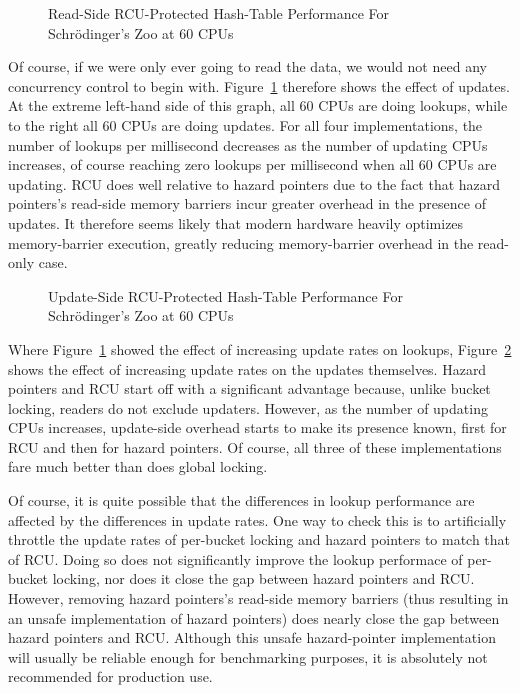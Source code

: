 \begin{figure}[tb]
\centering
{}
\caption{Read-Side RCU-Protected Hash-Table Performance For Schr\"odinger's Zoo at 60 CPUs}
\label{fig:datastruct:Read-Side RCU-Protected Hash-Table Performance For Schroedinger's Zoo at 60 CPUs}
\end{figure}

Of course, if we were only ever going to read the data, we would not need
any concurrency control to begin with.
Figure~\ref{fig:datastruct:Read-Side RCU-Protected Hash-Table Performance For Schroedinger's Zoo at 60 CPUs}
therefore shows the effect of updates.
At the extreme left-hand side of this graph, all 60 CPUs are doing lookups,
while to the right all 60 CPUs are doing updates.
For all four implementations, the number of lookups per millisecond
decreases as the number of updating CPUs increases, of course reaching
zero lookups per millisecond when all 60 CPUs are updating.
RCU does well relative to hazard pointers due to the fact that hazard
pointers's read-side memory barriers incur greater overhead in the
presence of updates.
It therefore seems likely that modern hardware heavily optimizes memory-barrier
execution, greatly reducing memory-barrier overhead in the read-only case.

\begin{figure}[tb]
\centering
{}
\caption{Update-Side RCU-Protected Hash-Table Performance For Schr\"odinger's Zoo at 60 CPUs}
\label{fig:datastruct:Update-Side RCU-Protected Hash-Table Performance For Schroedinger's Zoo at 60 CPUs}
\end{figure}

Where
Figure~\ref{fig:datastruct:Read-Side RCU-Protected Hash-Table Performance For Schroedinger's Zoo at 60 CPUs}
showed the effect of increasing update rates on lookups,
Figure~\ref{fig:datastruct:Update-Side RCU-Protected Hash-Table Performance For Schroedinger's Zoo at 60 CPUs}
shows the effect of increasing update rates on the updates themselves.
Hazard pointers and RCU start off with a significant advantage because,
unlike bucket locking, readers do not exclude updaters.
However, as the number of updating CPUs increases, update-side overhead
starts to make its presence known, first for RCU and then for hazard
pointers.
Of course, all three of these implementations fare much better than does
global locking.

Of course, it is quite possible that the differences in lookup performance
are affected by the differences in update rates.
One way to check this is to artificially throttle the update rates of
per-bucket locking and hazard pointers to match that of RCU.
Doing so does not significantly improve the lookup performace of
per-bucket locking, nor does it close the gap between hazard pointers
and RCU.
However, removing hazard pointers's read-side memory barriers
(thus resulting in an unsafe implementation of hazard pointers)
does nearly close the gap between hazard pointers and RCU.
Although this unsafe hazard-pointer implementation will
usually be reliable enough for benchmarking purposes, it is absolutely
not recommended for production use.

